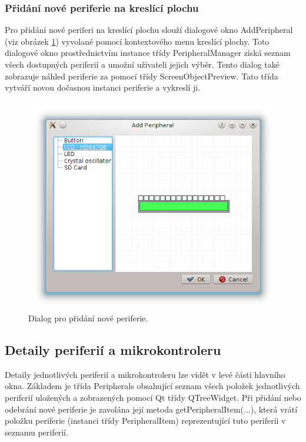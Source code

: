 \subsubsection{Přidání nové periferie na kreslící plochu}

Pro přidání nové periferi na kreslící plochu slouží dialogové okno AddPeripheral (viz obrázek \ref{fig:addperipheral}) vyvolané pomocí kontextového menu kreslící plochy. Toto dialogové okno prostřednictvím instance třídy PeripheralManager získá seznam všech dostupných periferií a umožní uživateli jejich výběr. Tento dialog také zobrazuje náhled periferie za pomocí třídy ScreenObjectPreview. Tato třída vytváří novou dočasnou instanci periferie a vykreslí ji.

\begin{figure}[ht]
\centering
\includegraphics[trim=0cm 0cm 0cm 0cm]{fig/addperipheral}
\caption{Dialog pro přidání nové periferie.}
\label{fig:addperipheral}
\end{figure}

\subsection{Detaily periferií a mikrokontroleru}
\label{detaily_per}

Detaily jednotlivých periferií a mikrokontroleru lze vidět v levé části hlavního okna. Základem je třída Peripherals obsahující seznam všech položek jednotlivých periferií uložených a zobrazených pomocí Qt třídy QTreeWidget. Při přidání nebo odebrání nové periferie je zavolána její metoda getPeripheralItem(...), která vrátí položku periferie (instanci třídy PeripheralItem) reprezentující tuto periferii v seznamu periferií.

